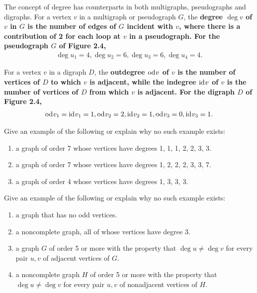 The concept of degree has counterparts in both multigraphs, pseudographs and digraphs. For a vertex $v$ in a multigraph or pseudograph $G$, the \bf{degree} $\deg{}{v}$ of $v$ in $G$ is the number of edges of $G$ incident with $v$, where there is a contribution of 2 for each loop at $v$ in a pseudograph. For the pseudograph $G$ of Figure 2.4,
\begin{align*}
\deg{}{u_{1}} = 4, \deg{}{u_{2}} = 6, \deg{}{u_{3}} = 6, \deg{}{u_{4}} = 4.
\end{align*}



For a vertex $v$ in a digraph $D$, the \bf{outdegree} $\text{\normalfont od}_{} v$ of $v$ is the number of vertices of $D$ to which $v$ is adjacent, while the \bf{indegree} $\text{\normalfont id}_{} v$ of $v$ is the number of vertices of $D$ from which $v$ is adjacent. For the digraph $D$ of Figure 2.4,
\begin{align*}
\text{\normalfont od}_{} v_{1} = \text{\normalfont id}_{} v_{1} = 1, \text{\normalfont od}_{} v_{2} = 2, \text{\normalfont id}_{} v_{2} = 1, \text{\normalfont od}_{} v_{3} = 0, \text{\normalfont id}_{} v_{3} = 1.
\end{align*}

\begin{exers}\end{exers}

\begin{exer}
Give an example of the following or explain why no such example exists:
\begin{enumerate}[{(a)}]
\item a graph of order 7 whose vertices have degrees 1, 1, 1, 2, 2, 3, 3.
\item a graph of order 7 whose vertices have degrees 1, 2, 2, 2, 3, 3, 7.
\item a graph of order 4 whose vertices have degrees 1, 3, 3, 3.
\end{enumerate}
\end{exer}

\begin{exer}
Give an example of the following or explain why no such example exists:
\begin{enumerate}[{(a)}]
\item a graph that has no odd vertices.
\item a noncomplete graph, all of whose vertices have degree 3.
\item a graph $G$ of order 5 or more with the property that $\deg{}{u} \neq \deg{}{v}$ for every pair $u,v$ of adjacent vertices of $G$.
\item a noncomplete graph $H$ of order 5 or more with the property that $\deg{}{u} \neq \deg{}{v}$ for every pair $u,v$ of nonadjacent vertices of $H$.
\end{enumerate}
\end{exer}

